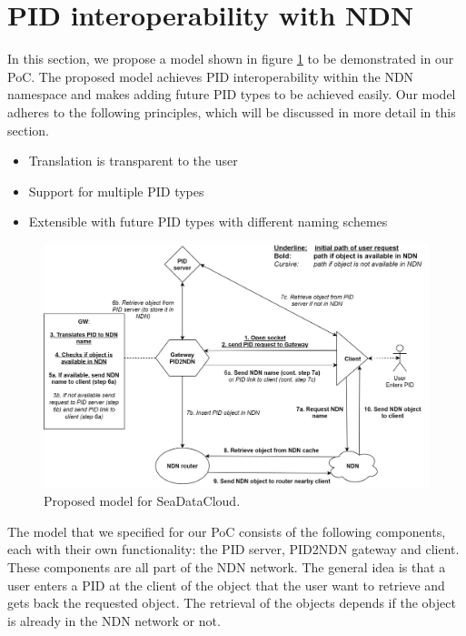 \section{PID interoperability with NDN}\label{pid-poc}

In this section, we propose a model shown in figure \ref{fig:sdc_model} to be demonstrated in our PoC. The proposed model achieves PID interoperability within the NDN namespace and makes adding future PID types to be achieved easily.
\newline
\newline
Our model adheres to the following principles, which will be discussed in more detail in this section.

\begin{itemize}
    \item{Translation is transparent to the user}
    \item{Support for multiple PID types}
    \item{Extensible with future PID types with different naming schemes}
\end{itemize}

\begin{figure}[H]
\centering
\includegraphics[scale=0.25]{Images/PIDNDN_edit_final_5.png}
\caption{Proposed model for SeaDataCloud.}
\label{fig:sdc_model}
\end{figure}

The model that we specified for our PoC consists of the following components, each with their own functionality: the PID server, PID2NDN gateway and client. These components are all part of the NDN network. The general idea is that a user enters a PID at the client of the object that the user want to retrieve and gets back the requested object. The retrieval of the objects depends if the object is already in the NDN network or not.  

